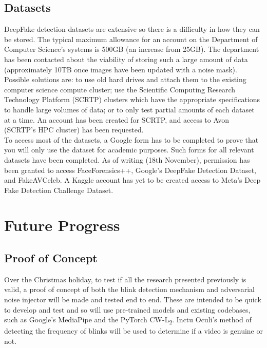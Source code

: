 \documentclass{article}
\begin{document}
\subsection{Datasets} \label{sec:datasets}

DeepFake detection datasets are extensive so there is a difficulty in how they can be stored. The typical maximum allowance for an account on the Department of Computer Science's systems is 500GB (an increase from 25GB)\cite{dcsquota}. The department has been contacted about the viability of storing such a large amount of data (approximately 10TB once images have been updated with a noise mask). Possible solutions are: to use old hard drives and attach them to the existing computer science compute cluster; use the  Scientific Computing Research Technology Platform (SCRTP) clusters which have the appropriate specifications to handle large volumes of data; or to only test partial amounts of each dataset at a time. An account has been created for SCRTP, and access to Avon (SCRTP's HPC cluster) has been requested.\\

To access most of the datasets, a Google form has to be completed to prove that you will only use the dataset for academic purposes. Such forms for all relevant datasets have been completed. As of writing (18th November), permission has been granted to access FaceForensics++, Google's DeepFake Detection Dataset, and FakeAVCeleb. A Kaggle account has yet to be created access to Meta's Deep Fake Detection Challenge Dataset.

\section{Future Progress} \label{sec:future-progress}
\subsection{Proof of Concept}

Over the Christmas holiday, to test if all the research presented previously is valid, a proof of concept of both the blink detection mechanism and adversarial noise injector will be made and tested end to end. These are intended to be quick to develop and test and so will use pre-trained models and existing codebases, such as Google's MediaPipe\cite{mediapipe} and the PyTorch CW-L\textsubscript{2}\cite{cwl2python}. Inctu Oculi's method of detecting the frequency of blinks will be used to determine if a video is genuine or not.
\end{document}
